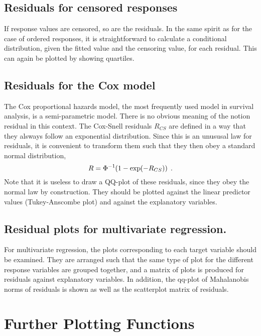 \documentclass[11pt]{article}\usepackage[]{graphicx}\usepackage[]{color}
\begin{document}
  
\subsection{Residuals for censored responses}
If response values are censored, so are the residuals. In the same spirit
as for the case of ordered responses, it is straightforward to calculate 
a conditional distribution, given the fitted value and the censoring value,
for each residual. This can again be plotted by showing quartiles.

\subsection{Residuals for the Cox model}

The Cox proportional hazards model, the most frequently used model in
survival analysis, is a semi-parametric model. There is no obvious meaning
of the notion residual in this context. 
The Cox-Snell residuals $R_{CS}$ are defined in a way that they alsways
follow an exponential distribution. 
Since this is an unususal law for residuals, it is convenient to transform
them such that they then obey a standard normal distribution,
\[
  R = \Phi^{-1}\kern-2pt\left(1-\exp\kern-2pt\left(-R_{CS}\right)\right)
\;.\]
Note that it is useless to draw a QQ-plot of these residuals, since they
obey the normal law by construction. 
They should be plotted against the linear predictor values 
(Tukey-Anscombe plot) and against the explanatory variables.


\subsection{Residual plots for multivariate regression.}
For multivariate regression, the plots corresponding to each target
variable should be examined. 
They are arranged such that the same type of plot for the different
response variables are grouped together, and a matrix of plots is produced
for residuals against explanatory variables.
In addition, the qq-plot of Mahalanobis norms of residuals is shown as well
as the scatterplot matrix of residuals.

\Vneed{30mm}
\section{Further Plotting Functions}
\end{document}
